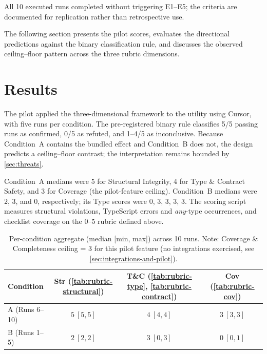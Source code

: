 \documentclass[12pt,a4paper]{report}
\begin{document}
All 10 executed runs completed without triggering E1--E5; the criteria are documented for replication rather than retrospective use.

The following section presents the pilot scores, evaluates the directional predictions against the binary classification rule, and discusses the observed ceiling--floor pattern across the three rubric dimensions.

\section{Results}
\label{sec:pilot-results}

The pilot applied the three-dimensional framework to the  utility using Cursor, with five runs per condition. The pre-registered binary rule classifies 5/5 passing runs as confirmed, 0/5 as refuted, and 1--4/5 as inconclusive. Because Condition~A contains the bundled effect and Condition~B does not, the design predicts a ceiling--floor contrast; the interpretation remains bounded by \autoref{sec:threats}.

Condition~A medians were 5 for Structural Integrity, 4 for Type \& Contract Safety, and 3 for Coverage (the pilot-feature ceiling). Condition~B medians were 2, 3, and 0, respectively; its Type scores were 0, 3, 3, 3, 3. The scoring script measures structural violations, TypeScript errors and \emph{any}-type occurrences, and checklist coverage on the 0--5 rubric defined above.



\begin{table}[H]
\centering
\caption{Per-condition aggregate (median [min, max]) across 10 runs. Note: Coverage \& Completeness ceiling = 3 for this pilot feature (no integrations exercised, see \autoref{sec:integrations-and-pilot}).}
\label{tbl:pilot-aggregate}
\small
\begin{tabular}{@{}l ccc@{}}
\toprule
\textbf{Condition} & \textbf{Str} (\autoref{tab:rubric-structural}) & \textbf{T\&C} (\autoref{tab:rubric-type}, \autoref{tab:rubric-contract}) & \textbf{Cov} (\autoref{tab:rubric-cov}) \\
\midrule
A (Runs 6--10)  & $5\ [5, 5]$ & $4\ [4, 4]$ & $3\ [3, 3]$ \\
B (Runs 1--5)   & $2\ [2, 2]$ & $3\ [0, 3]$ & $0\ [0, 1]$ \\
\bottomrule
\end{tabular}
\normalsize
\end{table}
\end{document}
